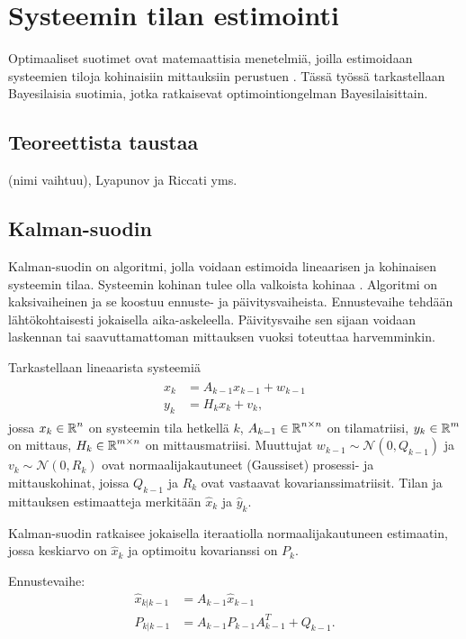 \chapter{Systeemin tilan estimointi }%
\label{ch:estimointi}
Optimaaliset suotimet ovat  matemaattisia menetelmiä, joilla estimoidaan systeemien tiloja kohinaisiin mittauksiin perustuen \cite{sarkka_bayesian}. Tässä työssä tarkastellaan Bayesilaisia suotimia, jotka ratkaisevat optimointiongelman Bayesilaisittain. 

\section{Teoreettista taustaa}
{\color{red} (nimi vaihtuu), Lyapunov ja Riccati yms.}

\section{Kalman-suodin}

Kalman-suodin on algoritmi, jolla voidaan estimoida lineaarisen ja kohinaisen systeemin tilaa. Systeemin kohinan tulee olla valkoista kohinaa \cite[s. 56]{sarkka_bayesian}. Algoritmi on kaksivaiheinen ja se koostuu ennuste- ja päivitysvaiheista. 
Ennustevaihe tehdään lähtökohtaisesti jokaisella aika-askeleella. Päivitysvaihe sen sijaan voidaan laskennan tai saavuttamattoman mittauksen vuoksi toteuttaa harvemminkin. 

Tarkastellaan lineaarista systeemiä
\begin{align}
    \begin{split}
        x_k &= A_{k-1}x_{k-1} + w_{k-1} \\
        y_k &= H_k x_k + v_k,
    \end{split}
\end{align}
jossa \(x_k \in \operatorname{\mathbb{R}}^n \) on systeemin tila hetkellä \(k\), \(A_{k-1}\in \operatorname{\mathbb{R}}^{n\times n}\) on tilamatriisi, \(y_k\in \operatorname{\mathbb{R}}^m\) on mittaus, \(H_k \in \operatorname{\mathbb{R}}^{m \times n}\) on mittausmatriisi. Muuttujat \(w_{k-1} \sim \mathcal{N}(0, Q_{k-1})\) ja \(v_k \sim \mathcal{N}(0, R_k)\) ovat normaalijakautuneet (Gaussiset) prosessi- ja mittauskohinat, joissa \(Q_{k-1}\) ja \(R_k\) ovat vastaavat kovarianssimatriisit. Tilan ja mittauksen estimaatteja merkitään \(\hat{x}_k\) ja \(\hat{y}_k\).

Kalman-suodin ratkaisee jokaisella iteraatiolla normaalijakautuneen estimaatin, jossa keskiarvo on \(\hat{x}_k\) ja optimoitu kovarianssi on \(P_k\).  

Ennustevaihe:
\begin{align}
    \hat{x}_{k | k-1}  &= A_{k-1} \hat{x}_{k-1}\\
    P_{k | k-1} &= A_{k-1} P_{k-1} A_{k-1}^T + Q_{k-1}.
\end{align}

